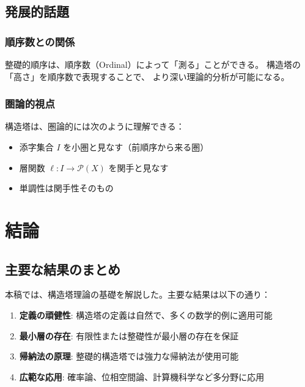 \documentclass[a4paper,12pt]{ltjsarticle}
\begin{document}
\subsection{発展的話題}

\subsubsection{順序数との関係}

整礎的順序は、順序数（Ordinal）によって「測る」ことができる。
構造塔の「高さ」を順序数で表現することで、
より深い理論的分析が可能になる。

\subsubsection{圏論的視点}

構造塔は、圏論的には次のように理解できる：
\begin{itemize}
    \item 添字集合 $I$ を小圏と見なす（前順序から来る圏）
    \item 層関数 $\ell : I \to \mathcal{P}(X)$ を関手と見なす
    \item 単調性は関手性そのもの
\end{itemize}

\begin{center}
\end{center}

\section{結論}

\subsection{主要な結果のまとめ}

本稿では、構造塔理論の基礎を解説した。主要な結果は以下の通り：

\begin{enumerate}
    \item \textbf{定義の頑健性}: 構造塔の定義は自然で、多くの数学的例に適用可能
    \item \textbf{最小層の存在}: 有限性または整礎性が最小層の存在を保証
    \item \textbf{帰納法の原理}: 整礎的構造塔では強力な帰納法が使用可能
    \item \textbf{広範な応用}: 確率論、位相空間論、計算機科学など多分野に応用
\end{enumerate}
\end{document}
